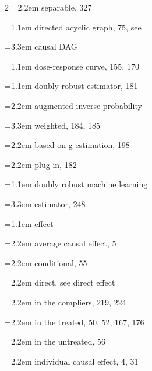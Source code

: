 \begin{multicols}{2}
\hspace*{1.1em}\hangindent=2.2em separable, 327\par
\hangindent=1.1em directed acyclic graph, 75, see\par
\hspace*{2.2em}\hangindent=3.3em causal DAG\par
\hangindent=1.1em dose-response curve, 155, 170\par
\hangindent=1.1em doubly robust estimator, 181\par
\hspace*{1.1em}\hangindent=2.2em augmented inverse probability\par
\hspace*{2.2em}\hangindent=3.3em weighted, 184, 185\par
\hspace*{1.1em}\hangindent=2.2em based on g-estimation, 198\par
\hspace*{1.1em}\hangindent=2.2em plug-in, 182\par
\hangindent=1.1em doubly robust machine learning\par
\hspace*{2.2em}\hangindent=3.3em estimator, 248\par
\hangindent=1.1em effect\par
\hspace*{1.1em}\hangindent=2.2em average causal effect, 5\par
\hspace*{1.1em}\hangindent=2.2em conditional, 55\par
\hspace*{1.1em}\hangindent=2.2em direct, see direct effect\par
\hspace*{1.1em}\hangindent=2.2em in the compliers, 219, 224\par
\hspace*{1.1em}\hangindent=2.2em in the treated, 50, 52, 167, 176\par
\hspace*{1.1em}\hangindent=2.2em in the untreated, 56\par
\hspace*{1.1em}\hangindent=2.2em individual causal effect, 4, 31\par

\end{multicols}
